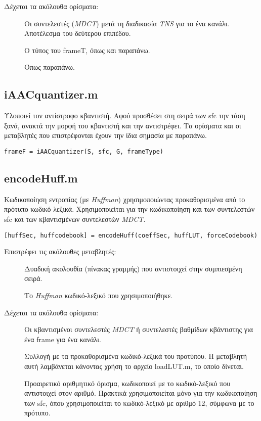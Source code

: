 \noindent Δέχεται τα ακόλουθα ορίσματα:
\begin{description}
  \item[] Οι συντελεστές (\emph{MDCT}) μετά τη διαδικασία \emph{TNS}
    για το ένα κανάλι. Αποτέλεσμα του δεύτερου επιπέδου.
  \item[] Ο τύπος του frameT, όπως και παραπάνω.
  \item[] Όπως παραπάνω.
\end{description}

\subsection*{iAACquantizer.m}
Υλοποιεί τον αντίστροφο κβαντιστή. Αφού προσθέσει στη σειρά των sfc την τάση ξανά,
ανακτά την μορφή του κβαντιστή και την αντιστρέφει. Τα ορίσματα και οι μεταβλητές
που επιστρέφονται έχουν την ίδια σημασία με παραπάνω.
\begin{center}
  \verb|frameF = iAACquantizer(S, sfc, G, frameType)|
\end{center}

\subsection*{encodeHuff.m}
Κωδικοποίηση εντροπίας (με \emph{Huﬀman}) χρησιμοποιώντας προκαθορισμένα από το πρότυπο
κωδικό-λεξικά. Χρησιμοποιείται για την κωδικοποίηση και των συντελεστών sfc και
των κβαντισμένων συντελεστών \emph{MDCT}.
\begin{center}
  \verb|[huffSec, huffcodebook] = encodeHuff(coeffSec, huffLUT, forceCodebook)|
\end{center}

\noindent Επιστρέφει τις ακόλουθες μεταβλητές:
\begin{description}
  \item[] Δυαδική ακολουθία (πίνακας γραμμής) που αντιστοιχεί στην
    συμπιεσμένη σειρά.
  \item[] Το \emph{Huﬀman} κωδικό-λεξικό που χρησιμοποιήθηκε.
\end{description}

\noindent Δέχεται τα ακόλουθα ορίσματα:
\begin{description}
  \item[] Οι κβαντισμένοι συντελεστές \emph{MDCT} ή συντελεστές βαθμίδων κβάντιστης
    για ένα frame για ένα κανάλι.
  \item[] Συλλογή με τα προκαθορισμένα κωδικό-λεξικά του προτύπου.
    Η μεταβλητή αυτή λαμβάνεται κάνοντας χρήση το αρχείο loadLUT.m, το οποίο δίνεται.
  \item[] Προαιρετικό αριθμητικό όρισμα, κωδικοποιεί με το κωδικό-λεξικό που αντιστοιχεί
    στον αριθμό. Πρακτικά χρησιμοποιείται μόνο για την κωδικοποίηση των sfc, όπου
    χρησιμοποιείται το κωδικό-λεξικό με αριθμό 12, σύμφωνα με το πρότυπο.
\end{description}


